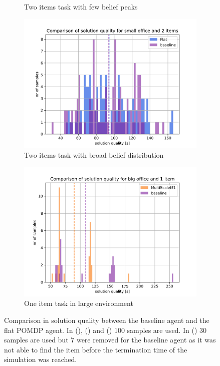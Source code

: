 \begin{figure}
\begin{subfigure}[b]{0.49\textwidth}
        \caption{Two items task with few belief peaks}
        \label{subfig:b1vsFlat_sc04}
    \end{subfigure}
    \hfill
    \begin{subfigure}[t]{0.49\textwidth}
        \includegraphics[width=\textwidth]{Report/images/sol_quality/envsmall_sc06_solqual_hist.png}
        \caption{Two items task with broad belief distribution}
        \label{subfig:b1vsFlat_sc06}
    \end{subfigure}
    \hfill
    \begin{subfigure}[t]{0.49\textwidth}
         \includegraphics[width=\textwidth]{Report/images/sol_quality/envbig_sc01_solqual_hist.png}
        \caption{One item task in large environment}
        \label{subfig:b1vsFlat_sc01Big}
    \end{subfigure}
    \caption{Comparison in solution quality between the baseline agent and the flat POMDP agent. In (), () and () 100 samples are used. In () 30 samples are used but 7 were removed for the baseline agent as it was not able to find the item before the termination time of the simulation was reached.}
    \label{fig:b1vsFlat}
\end{figure}
